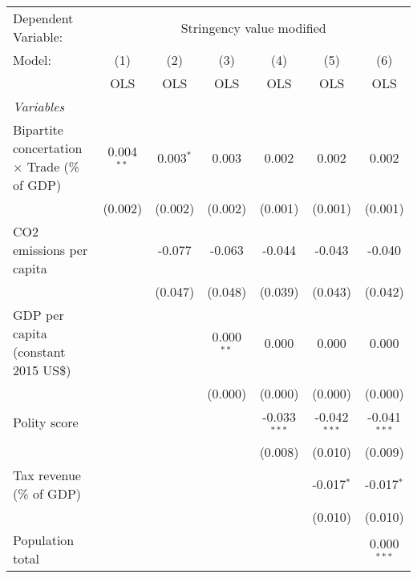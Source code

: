 
\begingroup
\centering
\begin{tabular}{lcccccc}
   \toprule
   Dependent Variable: & \multicolumn{6}{c}{Stringency value modified}\\
   Model:                                              & (1)          & (2)         & (3)          & (4)            & (5)            & (6)\\  
                                                       &  OLS         & OLS         & OLS          & OLS            & OLS            & OLS\\  
   \midrule
   \emph{Variables}\\
   Bipartite concertation $\times$ Trade (\% of GDP)   & 0.004$^{**}$ & 0.003$^{*}$ & 0.003        & 0.002          & 0.002          & 0.002\\   
                                                       & (0.002)      & (0.002)     & (0.002)      & (0.001)        & (0.001)        & (0.001)\\   
   CO2 emissions per capita                            &              & -0.077      & -0.063       & -0.044         & -0.043         & -0.040\\   
                                                       &              & (0.047)     & (0.048)      & (0.039)        & (0.043)        & (0.042)\\   
   GDP per capita (constant 2015 US\$)                 &              &             & 0.000$^{**}$ & 0.000          & 0.000          & 0.000\\   
                                                       &              &             & (0.000)      & (0.000)        & (0.000)        & (0.000)\\   
   Polity score                                        &              &             &              & -0.033$^{***}$ & -0.042$^{***}$ & -0.041$^{***}$\\   
                                                       &              &             &              & (0.008)        & (0.010)        & (0.009)\\   
   Tax revenue (\% of GDP)                             &              &             &              &                & -0.017$^{*}$   & -0.017$^{*}$\\   
                                                       &              &             &              &                & (0.010)        & (0.010)\\   
   Population total                                    &              &             &              &                &                & 0.000$^{***}$\\   

\end{tabular}
